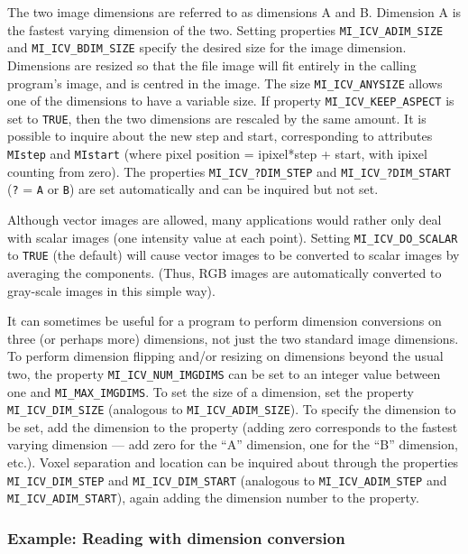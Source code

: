 The two image dimensions are referred to as dimensions A and B.
Dimension A is the fastest varying dimension of the two. Setting
properties \verb+MI_ICV_ADIM_SIZE+ and \verb+MI_ICV_BDIM_SIZE+ specify
the desired size for the image dimension. Dimensions are resized so
that the file image will fit entirely in the calling program's image,
and is centred in the image. The size \verb+MI_ICV_ANYSIZE+ allows
one of the dimensions to have a variable size. If property
\verb+MI_ICV_KEEP_ASPECT+ is set to \verb+TRUE+, then the two
dimensions are rescaled by the same amount. It is possible to inquire
about the new step and start, corresponding to attributes
\verb+MIstep+ and \verb+MIstart+ (where pixel position = ipixel*step +
start, with ipixel counting from zero). The properties
\verb+MI_ICV_?DIM_STEP+ and \verb+MI_ICV_?DIM_START+ (\verb+?+ =
\verb+A+ or \verb+B+) are set automatically and can be inquired but
not set.

Although vector images are allowed, many applications would rather
only deal with scalar images (one intensity value at each point).
Setting \verb+MI_ICV_DO_SCALAR+ to \verb+TRUE+ (the default) will
cause vector images to be converted to scalar images by averaging the
components.  (Thus, RGB images are automatically converted to
gray-scale images in this simple way).

It can sometimes be useful for a program to perform dimension
conversions on three (or perhaps more) dimensions, not just the two
standard image dimensions. To perform dimension flipping and/or
resizing on dimensions beyond the usual two, the property
\verb+MI_ICV_NUM_IMGDIMS+ can be set to an integer value between
one and \verb+MI_MAX_IMGDIMS+. To set the size of a dimension,
set the property \verb+MI_ICV_DIM_SIZE+ (analogous to
\verb+MI_ICV_ADIM_SIZE+). To specify the dimension to be set, add
the dimension to the property (adding zero corresponds to the fastest
varying dimension --- add zero for the ``A'' dimension, one for the
``B'' dimension, etc.). Voxel separation and
location can be inquired about through the properties
\verb+MI_ICV_DIM_STEP+ and \verb+MI_ICV_DIM_START+ (analogous to
\verb+MI_ICV_ADIM_STEP+ and \verb+MI_ICV_ADIM_START+), again
adding the dimension number to the property.

\subsubsection{Example: Reading with dimension conversion}

